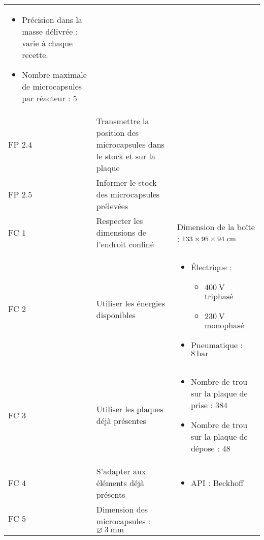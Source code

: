 \begin{longtable}{l|m{5cm}|m{5cm}}
\begin{itemize}
            \item Précision dans la masse délivrée : varie à chaque recette.
            \item Nombre maximale de microcapsules par réacteur : $5$
        \end{itemize}\\
        FP $2.4$&\centering Transmettre la position des microcapsules dans le stock et sur la plaque&\\
        FP $2.5$&\centering Informer le stock des microcapsules prélevées&\\
        FC $1$&\centering Respecter les dimensions de l'endroit confiné &Dimension de la boîte  : $\numproduct{133 x 95 x 94}~\unit{\cm}$\\
        FC $2$&\centering Utiliser les énergies disponibles& \begin{itemize}
            \item Électrique : \begin{itemize}
                \item $\qty{400}{\volt}$ triphasé
                \item $\qty{230}{\volt}$ monophasé
            \end{itemize}
            \item Pneumatique : $\qty{8}{\bar}$
        \end{itemize}\\ 
        FC $3$&\centering Utiliser les plaques déjà présentes&\begin{itemize}
            \item Nombre de trou sur la plaque de prise : $384$
            \item Nombre de trou sur la plaque de dépose : $48$
        \end{itemize}\\
        FC $4$&\centering S'adapter aux éléments déjà présents&\begin{itemize}
            \item API : Beckhoff
        \end{itemize}\\
        FC $5$&\centering Dimension des microcapsules : $\varnothing~\qty{3}{\mm}$&

    \end{longtable}
